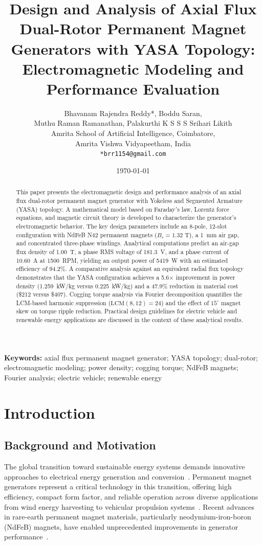 \documentclass[12pt,a4paper]{article}
\title{Design and Analysis of Axial Flux Dual-Rotor Permanent Magnet Generators with YASA Topology: Electromagnetic Modeling and Performance Evaluation}
\author{
  Bhavanam Rajendra Reddy*, Boddu Saran,\\ 
  Muthu Raman Ramanathan,   Palakurthi K S S S Srihari Likith\\
  Amrita School of Artificial Intelligence, Coimbatore,\\
   Amrita Vishwa Vidyapeetham, India\\
  \texttt{*brr1154@gmail.com}
}
\date{\today}
\begin{document}
\maketitle

\begin{abstract}
This paper presents the electromagnetic design and performance analysis of an axial flux dual-rotor permanent magnet generator with Yokeless and Segmented Armature (YASA) topology. A mathematical model based on Faraday's law, Lorentz force equations, and magnetic circuit theory is developed to characterize the generator's electromagnetic behavior. The key design parameters include an 8-pole, 12-slot configuration with NdFeB N42 permanent magnets ($B_r = 1.32$ T), a 1~mm air gap, and concentrated three-phase windings. Analytical computations predict an air-gap flux density of 1.00~T, a phase RMS voltage of 181.3~V, and a phase current of 10.60~A at 1500~RPM, yielding an output power of 5419~W with an estimated efficiency of 94.2\%. A comparative analysis against an equivalent radial flux topology demonstrates that the YASA configuration achieves a 5.6$\times$ improvement in power density (1.259~kW/kg versus 0.225~kW/kg) and a 47.9\% reduction in material cost (\$212 versus \$407). Cogging torque analysis via Fourier decomposition quantifies the LCM-based harmonic suppression ($\text{LCM}(8,12)=24$) and the effect of $15^{\circ}$ magnet skew on torque ripple reduction. Practical design guidelines for electric vehicle and renewable energy applications are discussed in the context of these analytical results.
\end{abstract}

\noindent\textbf{Keywords:} axial flux permanent magnet generator; YASA topology; dual-rotor; electromagnetic modeling; power density; cogging torque; NdFeB magnets; Fourier analysis; electric vehicle; renewable energy

\section{Introduction}
\subsection{Background and Motivation}
The global transition toward sustainable energy systems demands innovative approaches to electrical energy generation and conversion~\cite{ref1,ref2}. Permanent magnet generators represent a critical technology in this transition, offering high efficiency, compact form factor, and reliable operation across diverse applications from wind energy harvesting to vehicular propulsion systems~\cite{ref3,ref4,ref5}. Recent advances in rare-earth permanent magnet materials, particularly neodymium-iron-boron (NdFeB) magnets, have enabled unprecedented improvements in generator performance~\cite{ref6,ref7}.
\end{document}

